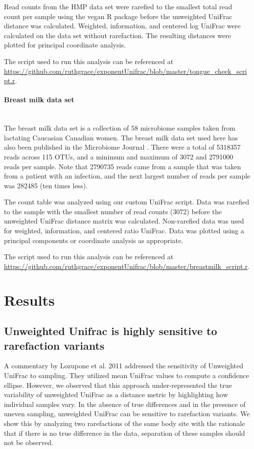 \documentclass[10pt,letterpaper]{article}
\begin{document}
Read counts from the HMP data set were rarefied to the smallest total read count per sample using the vegan R package \cite{oksanen2007vegan} before the unweighted UniFrac distance was calculated. Weighted, information, and centered log UniFrac were calculated on the data set without rarefaction. The resulting distances were plotted for principal coordinate analysis.

The script used to run this analysis can be referenced at \url{https://github.com/ruthgrace/exponentUnifrac/blob/master/tongue_cheek_script.r}.

\paragraph{Breast milk data set}\mbox{}\\
The breast milk data set is a collection of 58 microbiome samples taken from lactating Caucasian Canadian women. The breast milk data set used here has also been published in the Microbiome Journal \cite{urbaniak2016human}. There were a total of 5318357 reads across 115 OTUs, and a minimum and maximum of 3072 and 2791000 reads per sample. Note that 2790735 reads came from a sample that was taken from a patient with an infection, and the next largest number of reads per sample was 282485 (ten times less).

The count table was analyzed using our custom UniFrac script. Data was rarefied to the sample with the smallest number of read counts (3072) before the unweighted UniFrac distance matrix was calculated. Non-rarefied data was used for weighted, information, and centered ratio UniFrac. Data was plotted using a principal components or coordinate analysis as appropriate.

The script used to run this analysis can be referenced at \url{https://github.com/ruthgrace/exponentUnifrac/blob/master/breastmilk_script.r}.

\section*{Results}

\subsection{Unweighted Unifrac is highly sensitive to rarefaction variants}

A commentary by Lozupone et al. 2011 \cite{lozupone2011unifrac} addressed the sensitivity of Unweighted UniFrac to sampling. They utilized mean UniFrac values to compute a confidence ellipse. However, we observed that this approach under-represented the true variability of unweighted UniFrac as a distance metric by highlighting how individual samples vary. In the absence of true differences and in the presence of uneven sampling, unweighted UniFrac can be sensitive to rarefaction variants. We show this by analyzing two rarefactions of the same body site with the rationale that if there is no true difference in the data, separation of these samples should not be observed.
\end{document}
